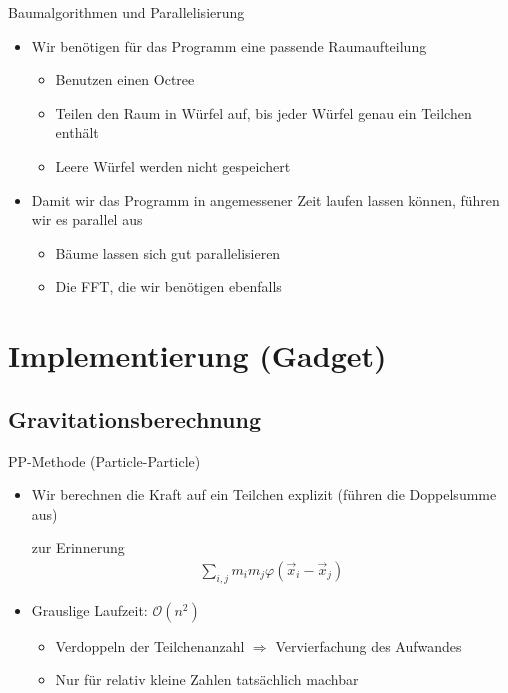 \documentclass{beamer}
\begin{document}
\begin{frame}{Baumalgorithmen und Parallelisierung}
  \begin{itemize}
    \item<1-> Wir benötigen für das Programm eine passende Raumaufteilung
      \begin{itemize}
        \item<2-> Benutzen einen \alert{Octree} \pause
        \item<3-> Teilen den Raum in Würfel auf, bis jeder Würfel genau ein Teilchen
          enthält \pause
        \item<4-> Leere Würfel werden nicht gespeichert \pause
      \end{itemize}
      \vskip20pt
    \item<5-> Damit wir das Programm in angemessener Zeit laufen lassen können,
      führen wir es parallel aus
      \begin{itemize}
        \item Bäume lassen sich gut parallelisieren
        \item Die FFT, die wir benötigen ebenfalls
      \end{itemize}
  \end{itemize}
\end{frame}

\section{Implementierung (Gadget)}
\subsection{Gravitationsberechnung}
\begin{frame}{PP-Methode (Particle-Particle)}
  \begin{itemize}
    \item Wir berechnen die Kraft auf ein Teilchen explizit (führen die
      Doppelsumme aus) \pause \\
      \begin{block}{zur Erinnerung}
        \begin{align}\sum_{i,j} m_i m_j \varphi(\vec x_i - \vec x_j)\end{align}
      \end{block}
      \vskip20pt
    \item Grauslige Laufzeit: $\mathcal{O}(n^2)$
      \begin{itemize}
        \item Verdoppeln der Teilchenanzahl $\Rightarrow$ Vervierfachung des
          Aufwandes \pause
        \item Nur für relativ kleine Zahlen tatsächlich machbar
      \end{itemize}
  \end{itemize}
\end{frame}
\end{document}
